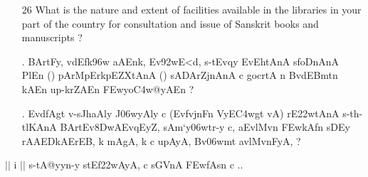 {\begin{itemize}
\begin{itemize}
           \item[(b)] Is the work of collecting Sanskrit manuscripts adequately organised in your region ?
           
           \item[(c)] Is the condition of Sanskrit manuscripts in the manuscript libraries in your region satisfactory in respect of preservation and cataloguing ?
           
           \item[(d)] Are the facilities for the loan, copying, and preparation of photostats and microfilms of manuscripts and for the reading of microfilms adequate in those libraries ?
           
           \end{itemize} 

\item[26] What is the nature and extent of facilities available in the libraries in your part of the country for consultation and issue of Sanskrit books and manuscripts ?
\end{itemize}
}

\begin{itemize}
\item[{\dn \dnnum \rn{27}}.] {\dn BArtFy\4, v\4d\?Efk\4\396w aAEnk\4, Ev\392wE<d, s\2-tEvqy\? EvEhtAnA\2 s\2foDnAnA\2 PlEn {\rs (\re}{\dn\dnnum {}}{\rs )\re} pArMpErkpEZXtAnA\2 {\rs (\re}{\dn \dnnum {}}{\rs )\re} sADArZjnAnA\2 c gocrtA\2 n\?\2 BvdEBmt\?n kAEn up-krZAEn \3FEwyo\3C4w@yAEn {\rs ?\re}}

\item[{\dn \dnnum \rn{28}}.] {\dn Evd\?fAgt\? v-s\2JhaAly\? J\306wyAly\? c {\rs (\re}EvfvjnF\-n\? VyE\3C4wgt\? vA{\rs )\re} rE\322wtAnA\2 s\2-th-tl\?KAnA\2{\rs ,\re} BArt\-Ev\38DwAEvqEyZ, sAm`y\306wtr-y c{\rs ,\re} aEvlMv\?n \3FEwkAfn\2 sDEy\2 rAAEDkAErEB, k\? mAgA\0, k\? c upAyA, Bv\306wmt\? avlMvnFyA, {\rs ?\re}}

\end{itemize}

\begin{center}
$||$ {\dn i }$||$ {\dn s\2-tA@yyn-y s\2tEf\322wAyA, c  s\2GVnA\2 \3FEwfAsn\2 c ..}
\end{center}

